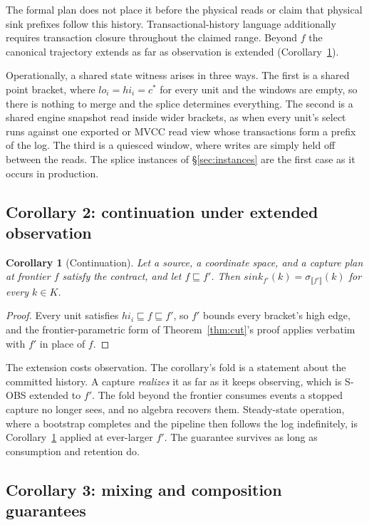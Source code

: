 \documentclass[sigconf,nonacm,10pt]{acmart}
\theoremstyle{plain}
\newtheorem{corollary}{Corollary}
\theoremstyle{definition}
\newcommand{\den}[1]{\llbracket #1 \rrbracket}   %
\newcommand{\pre}{\sqsubseteq}                   %
\newcommand{\sink}{\mathit{sink}}                %
\newcommand{\keys}{K}                            %
\begin{document}
The formal plan does not place it before the physical reads or claim
that physical sink prefixes follow this history. Transactional-history
language additionally requires transaction closure throughout the
claimed range. Beyond $f$ the canonical trajectory extends as
far as observation is extended (Corollary~\ref{cor:cont}).

Operationally, a shared state witness arises in three ways. The first is a
shared point bracket, where $lo_i = hi_i = c^{\ast}$ for every unit
and the windows are empty, so there is nothing to merge and the splice
determines everything. The second is a shared engine snapshot read
inside wider brackets, as when every unit's select runs against one
exported or MVCC read view whose transactions form a prefix of the log.
The third is a quiesced window, where
writes are simply held off between the reads. The splice instances of
\S\ref{sec:instances} are the first case as it occurs in production.

\subsection{Corollary 2: continuation under extended
observation}\label{sec:theorem-cont}

\begin{corollary}[Continuation]\label{cor:cont}
Let a source, a coordinate space, and a capture plan at frontier
$f$ satisfy the contract, and let $f \pre f'$. Then
$\sink_{f'}(k) = \sigma_{\den{f'}}(k)$ for every $k \in \keys$.
\end{corollary}

\begin{proof}
Every unit satisfies $hi_i \pre f \pre f'$, so $f'$ bounds every
bracket's high edge, and the frontier-parametric form of
Theorem~\ref{thm:cut}'s proof applies verbatim with $f'$ in place
of $f$.
\end{proof}

The extension costs observation. The
corollary's fold is a statement about the committed history. A
capture \emph{realizes} it as far as it keeps observing,
which is S-OBS extended to $f'$. The fold beyond the frontier
consumes events a stopped capture no longer sees, and no algebra
recovers them. Steady-state operation, where a bootstrap
completes and the pipeline then follows the log indefinitely, is
Corollary~\ref{cor:cont} applied at ever-larger $f'$. The
guarantee survives as long as consumption and retention
do.

\subsection{Corollary 3: mixing and composition guarantees}
\label{sec:theorem-mix}
\end{document}
